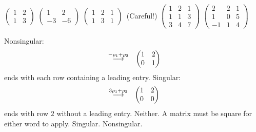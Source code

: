 \begin{exercises}
    \begin{exparts*}
      \partsitem \(
        \begin{pmatrix}
          1  &2  \\
          1  &3
        \end{pmatrix}   \)
      \partsitem \(
        \begin{pmatrix}
          1  &2  \\
         -3  &-6
        \end{pmatrix}   \)
      \partsitem \(
        \begin{pmatrix}
          1  &2  &1  \\
          1  &3  &1
        \end{pmatrix}   \)~(Careful!)
      \partsitem \(
        \begin{pmatrix}
          1  &2  &1  \\
          1  &1  &3  \\
          3  &4  &7
        \end{pmatrix}   \)
      \partsitem \(
        \begin{pmatrix}
          2  &2  &1  \\
          1  &0  &5  \\
         -1  &1  &4
        \end{pmatrix}   \)
    \end{exparts*}
    \begin{answer}
      \begin{exparts}
      \partsitem Nonsingular:
        \begin{eqnarray*}
          &\mathrel{ \mathop{\longrightarrow}\limits^{-\rho_1+\rho_2\mathstrut}_{ \begin{subarray}{l} \relax \end{subarray}}}
          &\begin{pmatrix}
            1  &2  \\
            0  &1
          \end{pmatrix}
        \end{eqnarray*}
        ends with each row containing a leading entry.
      \partsitem Singular:
        \begin{eqnarray*}
          &\mathrel{ \mathop{\longrightarrow}\limits^{3\rho_1+\rho_2\mathstrut}_{ \begin{subarray}{l} \relax \end{subarray}}}
          &\begin{pmatrix}
            1  &2  \\
            0  &0
          \end{pmatrix}
        \end{eqnarray*}
        ends with row \( 2 \) without a leading entry.
      \partsitem Neither.
        A matrix must be square for either word to apply.
      \partsitem Singular.
      \partsitem Nonsingular.

\end{exparts}
\end{answer}
\end{exercises}
